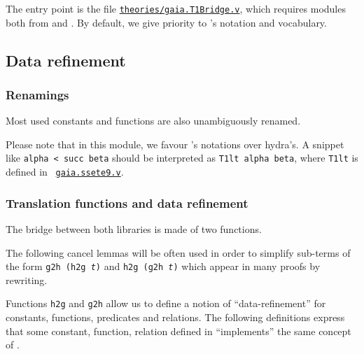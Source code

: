 The \gaiaHydras entry point is the file
\href{../theories/html/gaia_hydras.T1Bridge.html}%
{\texttt{theories/gaia.T1Bridge.v}}, which requires modules both from \HydrasLib and \gaia. By default, we give priority to \gaia's notation and vocabulary.






\subsection{Data refinement}

\subsubsection{Renamings}

Most used constants and functions are also unambiguously renamed.



Please note that in this module, we favour \gaia's notations over hydra's. A snippet like \texttt{alpha < succ beta} should be interpreted as \texttt{T1lt alpha beta}, where \texttt{T1lt} is defined in ~\href{https://github.com/coq-community/gaia/blob/master/theories/ssete9.v}{\texttt{gaia.ssete9.v}}.


\subsubsection{Translation functions and data refinement}

The bridge between both libraries is made of two functions.


The following cancel lemmas will be often used in order to simplify sub-terms of the form \texttt{g2h (h2g {\it t})} and \texttt{h2g (g2h {\it t})} which appear in many proofs by rewriting.





Functions \texttt{h2g} and \texttt{g2h} allow us to define
a notion of ``data-refinement''  for constants, functions, predicates and relations. The following definitions express that some
constant, function, relation defined in \HydrasLib ``implements'' the same concept of \gaia.

